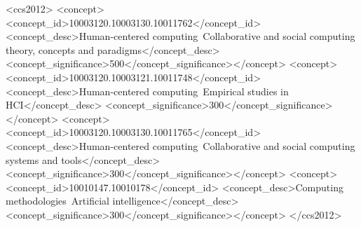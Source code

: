 \documentclass[acmsmall,screen,review,anonymous]{acmart}
\begin{document}
\begin{CCSXML}
<ccs2012>
 <concept><concept_id>10003120.10003130.10011762</concept_id>
  <concept_desc>Human-centered computing~Collaborative and social computing theory, concepts and paradigms</concept_desc>
  <concept_significance>500</concept_significance></concept>
 <concept><concept_id>10003120.10003121.10011748</concept_id>
  <concept_desc>Human-centered computing~Empirical studies in HCI</concept_desc>
  <concept_significance>300</concept_significance></concept>
 <concept><concept_id>10003120.10003130.10011765</concept_id>
  <concept_desc>Human-centered computing~Collaborative and social computing systems and tools</concept_desc>
  <concept_significance>300</concept_significance></concept>
 <concept><concept_id>10010147.10010178</concept_id>
  <concept_desc>Computing methodologies~Artificial intelligence</concept_desc>
  <concept_significance>300</concept_significance></concept>
</ccs2012>
\end{CCSXML}


\maketitle
\end{document}
